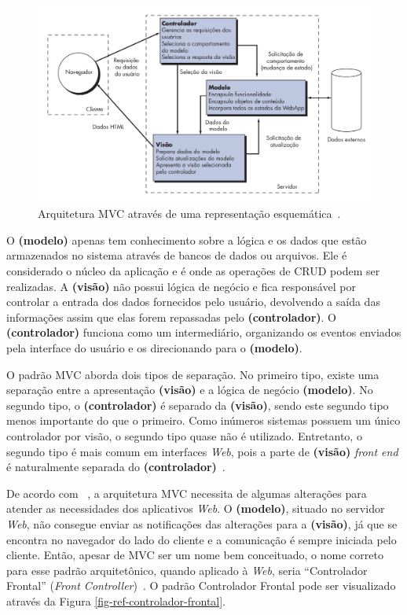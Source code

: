 \begin{figure}[h]
	\centering
	\includegraphics[scale=.39]{figuras/fig-ref-mvc} 
	\caption{Arquitetura MVC através de uma representação esquemática~\cite{pressman:es11}.}
	\label{fig-ref-mvc}
\end{figure}

O \textbf{(modelo)} apenas tem conhecimento sobre a lógica e os dados que estão armazenados no sistema através de bancos de dados ou arquivos. Ele é considerado o núcleo da aplicação e é onde as operações de CRUD podem ser realizadas. A \textbf{(visão)} não possui lógica de negócio e fica responsável por controlar a entrada dos dados fornecidos pelo usuário, devolvendo a saída das informações assim que elas forem repassadas pelo \textbf{(controlador)}. O \textbf{(controlador)} funciona como um intermediário, organizando os eventos enviados pela interface do usuário e os direcionando para o \textbf{(modelo)}.

O padrão MVC aborda dois tipos de separação. No primeiro tipo, existe uma separação entre a apresentação \textbf{(visão)} e a lógica de negócio \textbf{(modelo)}. No segundo tipo, o \textbf{(controlador)} é separado da \textbf{(visão)}, sendo este segundo tipo menos importante do que o primeiro. Como inúmeros sistemas possuem um único controlador por visão, o segundo tipo quase não é utilizado. Entretanto, o segundo tipo é mais comum em interfaces \textit{Web}, pois a parte de \textbf{(visão)} \textit{front end} é naturalmente separada do \textbf{(controlador)}~\cite{fowler:peaa02}.

De acordo com ~, a arquitetura MVC necessita de algumas alterações para atender as necessidades dos aplicativos \textit{Web}. O \textbf{(modelo)}, situado no servidor \textit{Web}, não consegue enviar as notificações das alterações para a \textbf{(visão)}, já que se encontra no navegador do lado do cliente e a comunicação é sempre iniciada pelo cliente. Então, apesar de MVC ser um nome bem conceituado, o nome correto para esse padrão arquitetônico, quando aplicado à \textit{Web}, seria ``Controlador Frontal'' (\textit{Front Controller})~\cite{alur-et-al:bpds03}. O padrão Controlador Frontal pode ser visualizado através da Figura \ref{fig-ref-controlador-frontal}.   

